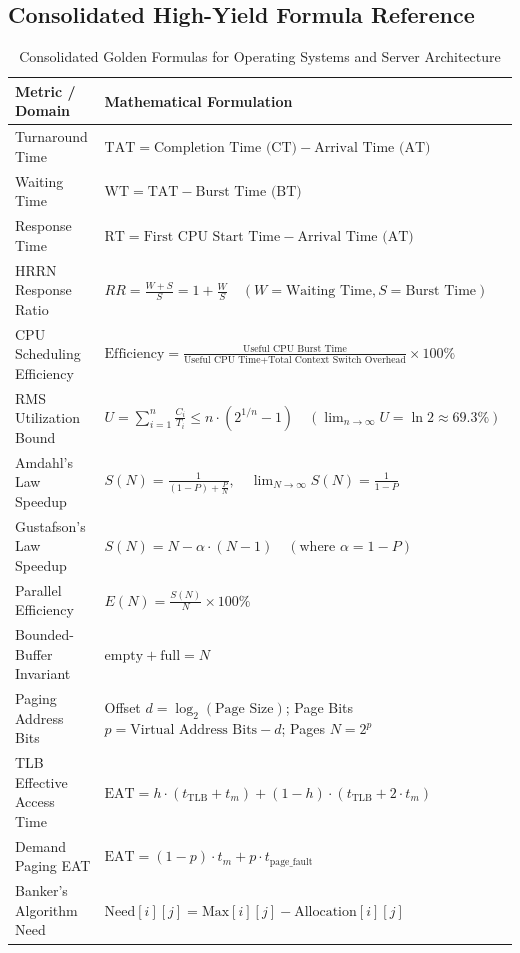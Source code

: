 \subsection{Consolidated High-Yield Formula Reference}
\begin{table}[htbp]
\centering
\small
\caption{Consolidated Golden Formulas for Operating Systems and Server Architecture}
\label{tab:golden_formulas_complete}
\begin{tabularx}{\textwidth}{l X}
\toprule
\textbf{Metric / Domain} & \textbf{Mathematical Formulation} \\
\midrule
Turnaround Time & $\text{TAT} = \text{Completion Time (CT)} - \text{Arrival Time (AT)}$ \\
Waiting Time & $\text{WT} = \text{TAT} - \text{Burst Time (BT)}$ \\
Response Time & $\text{RT} = \text{First CPU Start Time} - \text{Arrival Time (AT)}$ \\
HRRN Response Ratio & $RR = \frac{W + S}{S} = 1 + \frac{W}{S} \quad (W = \text{Waiting Time}, S = \text{Burst Time})$ \\
CPU Scheduling Efficiency & $\text{Efficiency} = \frac{\text{Useful CPU Burst Time}}{\text{Useful CPU Time} + \text{Total Context Switch Overhead}} \times 100\%$ \\
RMS Utilization Bound & $U = \sum_{i=1}^{n} \frac{C_i}{T_i} \le n \cdot (2^{1/n} - 1) \quad (\lim_{n \to \infty} U = \ln 2 \approx 69.3\%)$ \\
Amdahl's Law Speedup & $S(N) = \frac{1}{(1 - P) + \frac{P}{N}}, \quad \lim_{N \to \infty} S(N) = \frac{1}{1 - P}$ \\
Gustafson's Law Speedup & $S(N) = N - \alpha \cdot (N - 1) \quad (\text{where } \alpha = 1 - P)$ \\
Parallel Efficiency & $E(N) = \frac{S(N)}{N} \times 100\%$ \\
Bounded-Buffer Invariant & $\text{empty} + \text{full} = N$ \\
Paging Address Bits & Offset $d = \log_2(\text{Page Size})$; Page Bits $p = \text{Virtual Address Bits} - d$; Pages $N = 2^p$ \\
TLB Effective Access Time & $\text{EAT} = h \cdot (t_{\text{TLB}} + t_m) + (1 - h) \cdot (t_{\text{TLB}} + 2 \cdot t_m)$ \\
Demand Paging EAT & $\text{EAT} = (1 - p) \cdot t_m + p \cdot t_{\text{page\_fault}}$ \\
Banker's Algorithm Need & $\text{Need}[i][j] = \text{Max}[i][j] - \text{Allocation}[i][j]$ \\

\end{tabularx}
\end{table}
